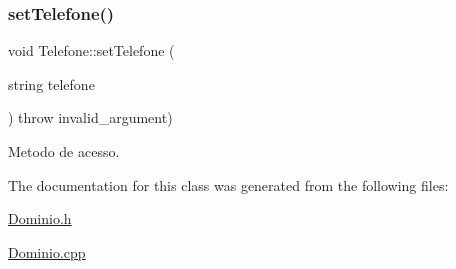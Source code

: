 \subsubsection{\texorpdfstring{set\+Telefone()}{setTelefone()}}
{\footnotesize\ttfamily void Telefone\+::set\+Telefone (\begin{DoxyParamCaption}\item[{string}]{telefone }\end{DoxyParamCaption}) throw  invalid\+\_\+argument) }

Metodo de acesso. 

The documentation for this class was generated from the following files\+:\begin{DoxyCompactItemize}
\item 
\hyperlink{_dominio_8h}{Dominio.\+h}\item 
\hyperlink{_dominio_8cpp}{Dominio.\+cpp}\end{DoxyCompactItemize}
